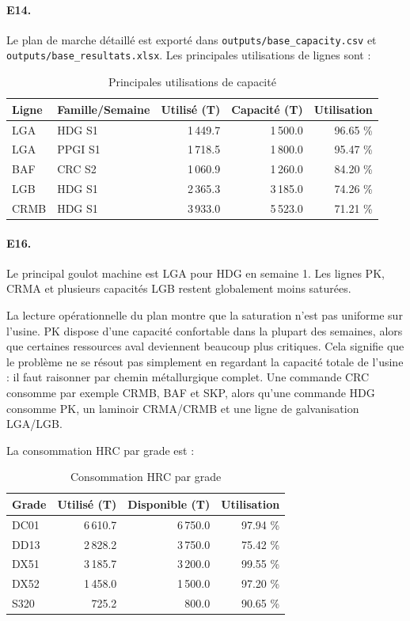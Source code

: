 \documentclass[12pt,a4paper]{article}
\newcommand{\question}[1]{\paragraph{\textcolor{blue!50!black}{#1.}}}
\begin{document}
\question{E14}
Le plan de marche détaillé est exporté dans \texttt{outputs/base\_capacity.csv} et \texttt{outputs/base\_resultats.xlsx}. Les principales utilisations de lignes sont :

\begin{table}[H]
\centering
\caption{Principales utilisations de capacité}
\begin{tabular}{llrrr}
\toprule
Ligne & Famille/Semaine & Utilisé (T) & Capacité (T) & Utilisation \\
\midrule
LGA & HDG S1 & 1\,449.7 & 1\,500.0 & 96.65 \% \\
LGA & PPGI S1 & 1\,718.5 & 1\,800.0 & 95.47 \% \\
BAF & CRC S2 & 1\,060.9 & 1\,260.0 & 84.20 \% \\
LGB & HDG S1 & 2\,365.3 & 3\,185.0 & 74.26 \% \\
CRMB & HDG S1 & 3\,933.0 & 5\,523.0 & 71.21 \% \\
\bottomrule
\end{tabular}
\end{table}

\question{E16}
Le principal goulot machine est LGA pour HDG en semaine 1. Les lignes PK, CRMA et plusieurs capacités LGB restent globalement moins saturées.

La lecture opérationnelle du plan montre que la saturation n'est pas uniforme sur l'usine. PK dispose d'une capacité confortable dans la plupart des semaines, alors que certaines ressources aval deviennent beaucoup plus critiques. Cela signifie que le problème ne se résout pas simplement en regardant la capacité totale de l'usine : il faut raisonner par chemin métallurgique complet. Une commande CRC consomme par exemple CRMB, BAF et SKP, alors qu'une commande HDG consomme PK, un laminoir CRMA/CRMB et une ligne de galvanisation LGA/LGB.

La consommation HRC par grade est :

\begin{table}[H]
\centering
\caption{Consommation HRC par grade}
\begin{tabular}{lrrr}
\toprule
Grade & Utilisé (T) & Disponible (T) & Utilisation \\
\midrule
DC01 & 6\,610.7 & 6\,750.0 & 97.94 \% \\
DD13 & 2\,828.2 & 3\,750.0 & 75.42 \% \\
DX51 & 3\,185.7 & 3\,200.0 & 99.55 \% \\
DX52 & 1\,458.0 & 1\,500.0 & 97.20 \% \\
S320 & 725.2 & 800.0 & 90.65 \% \\
\bottomrule
\end{tabular}
\end{table}
\end{document}
